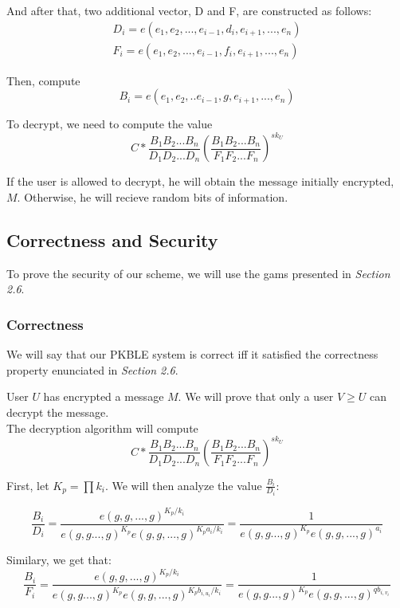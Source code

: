\documentclass[a4paper, 12pt, oneside]{article}
\begin{document}
And after that, two additional vector, D and F, are constructed as follows:
\begin{align*}
D_i = e(e_1, e_2, ..., e_{i-1}, d_i, e_{i+1}, ..., e_n)\\
F_i = e(e_1, e_2, ..., e_{i-1}, f_i, e_{i+1}, ..., e_n)
\end{align*}

Then, compute \[B_i = e(e_1, e_2,..e_{i-1}, g, e_{i+1},..., e_n)\]

\bigskip
To decrypt, we need to compute the value \[C*\frac{B_1B_2...B_n}{D_1D_2...D_n}\left(\frac{B_1B_2...B_n}{F_1F_2...F_n}\right)^{sk_U}\] 

\bigskip
If the user is allowed to decrypt, he will obtain the message initially encrypted, $M$. Otherwise, he will recieve random bits of information.



\subsection{Correctness and Security}

To prove the security of our scheme, we will use the gams presented in \textit{Section 2.6}.

\subsubsection{Correctness}

We will say that our PKBLE system is correct iff it satisfied the correctness property enunciated in \textit{Section 2.6}. 


\bigskip
 User $U$ has encrypted a message $M$. We will prove that only a user $V \geq U$ can decrypt the message. 
\\

The decryption algorithm will compute 
\[C*\frac{B_1B_2...B_n}{D_1D_2...D_n}\left( \frac{B_1B_2...B_n}{F_1F_2...F_n}\right)^{sk_U}\]

First, let $K_p = \prod{k_i}$. We will then analyze the value $\frac{B_i}{D_i}$:


\[\frac{B_i}{D_i} =
\frac{e(g, g, ..., g)^{K_p/k_i}}{e(g, g..., g)^{K_p}e(g, g, ..., g)^{K_pa_i/k_i}} = 
\frac{1}{e(g, g..., g)^{K_p}e(g, g, ..., g)^{a_i}}\]

Similary, we get that: 
\[\frac{B_i}{F_i} =
\frac{e(g, g, ..., g)^{K_p/k_i}}{e(g, g..., g)^{K_p}e(g, g, ..., g)^{K_pb_{i, u_i}/k_i}} = 
\frac{1}{e(g, g..., g)^{K_p}e(g, g, ..., g)^{qb_{i, v_i}}}\]
\end{document}
